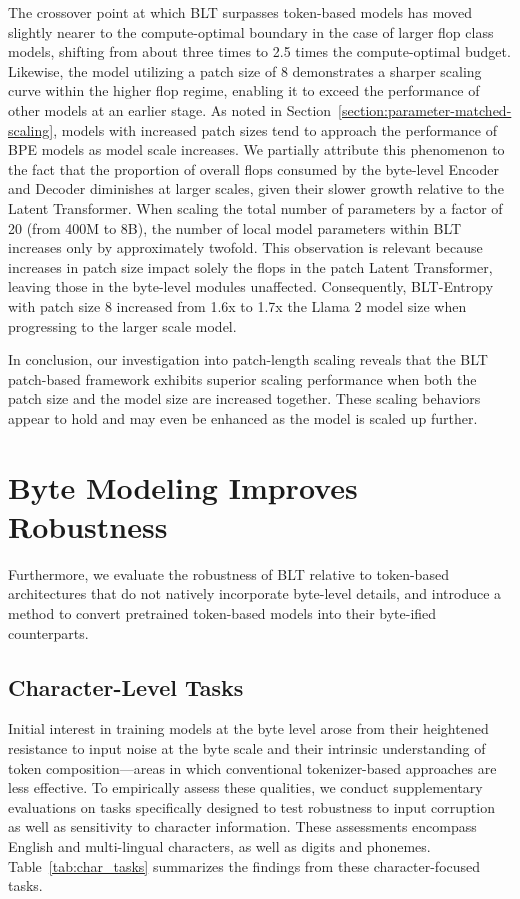 The crossover point at which {\textsc BLT} surpasses token-based models has moved slightly nearer to the compute-optimal boundary in the case of larger flop class models, shifting from about three times to 2.5 times the compute-optimal budget. Likewise, the model utilizing a patch size of 8 demonstrates a sharper scaling curve within the higher flop regime, enabling it to exceed the performance of other models at an earlier stage. As noted in Section~\ref{section:parameter-matched-scaling}, models with increased patch sizes tend to approach the performance of BPE models as model scale increases. We partially attribute this phenomenon to the fact that the proportion of overall flops consumed by the byte-level Encoder and Decoder diminishes at larger scales, given their slower growth relative to the Latent Transformer. When scaling the total number of parameters by a factor of 20 (from 400M to 8B), the number of local model parameters within {\textsc BLT} increases only by approximately twofold. This observation is relevant because increases in patch size impact solely the flops in the patch Latent Transformer, leaving those in the byte-level modules unaffected. Consequently, {\textsc BLT}-Entropy with patch size 8 increased from 1.6x to 1.7x the Llama 2 model size when progressing to the larger scale model.

In conclusion, our investigation into patch-length scaling reveals that the {\textsc BLT} patch-based framework exhibits superior scaling performance when both the patch size and the model size are increased together. These scaling behaviors appear to hold and may even be enhanced as the model is scaled up further.

\section{Byte Modeling Improves Robustness} Furthermore, we evaluate the robustness of {\textsc BLT} relative to token-based architectures that do not natively incorporate byte-level details, and introduce a method to convert pretrained token-based models into their byte-ified counterparts.
\label{sec:robustness}

\subsection{Character-Level Tasks}

Initial interest in training models at the byte level arose from their heightened resistance to input noise at the byte scale and their intrinsic understanding of token composition—areas in which conventional tokenizer-based approaches are less effective. To empirically assess these qualities, we conduct supplementary evaluations on tasks specifically designed to test robustness to input corruption as well as sensitivity to character information. These assessments encompass English and multi-lingual characters, as well as digits and phonemes. Table~\ref{tab:char_tasks} summarizes the findings from these character-focused tasks.

